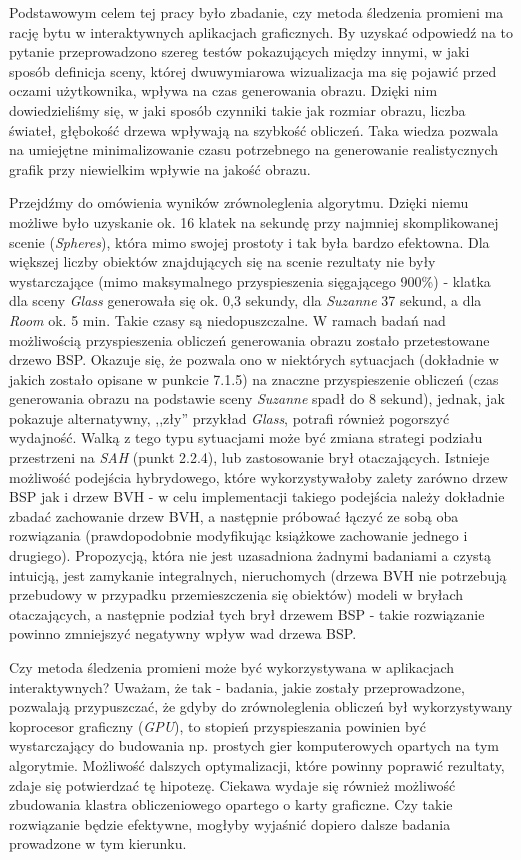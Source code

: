 Podstawowym celem tej pracy było zbadanie, czy metoda śledzenia promieni ma rację bytu w interaktywnych aplikacjach graficznych. By uzyskać odpowiedź na to pytanie przeprowadzono szereg testów pokazujących między innymi, w jaki sposób definicja sceny, której dwuwymiarowa wizualizacja ma się pojawić przed oczami użytkownika, wpływa na czas generowania obrazu. Dzięki nim dowiedzieliśmy się, w jaki sposób czynniki takie jak rozmiar obrazu, liczba świateł, głębokość drzewa wpływają na szybkość obliczeń. Taka wiedza pozwala na umiejętne minimalizowanie czasu potrzebnego na generowanie realistycznych grafik przy niewielkim wpływie na jakość obrazu.

Przejdźmy do omówienia wyników zrównoleglenia algorytmu. Dzięki niemu możliwe było uzyskanie ok. 16 klatek na sekundę przy najmniej skomplikowanej scenie (\emph{Spheres}), która mimo swojej prostoty i tak była bardzo efektowna. Dla większej liczby obiektów znajdujących się na scenie rezultaty nie były wystarczające (mimo maksymalnego przyspieszenia sięgającego 900\%) - klatka dla sceny \emph{Glass} generowała się ok. 0,3 sekundy, dla \emph{Suzanne} 37 sekund, a dla \emph{Room} ok. 5 min. Takie czasy są niedopuszczalne. W ramach badań nad możliwością przyspieszenia obliczeń generowania obrazu zostało przetestowane drzewo BSP. Okazuje się, że pozwala ono w niektórych sytuacjach (dokładnie w jakich zostało opisane w punkcie 7.1.5) na znaczne przyspieszenie obliczeń (czas generowania obrazu na podstawie sceny \emph{Suzanne} spadł do 8 sekund), jednak, jak pokazuje alternatywny, ,,zły'' przykład \emph{Glass}, potrafi również pogorszyć wydajność. Walką z tego typu sytuacjami może być zmiana strategi podziału przestrzeni na \emph{SAH} (punkt 2.2.4), lub zastosowanie brył otaczających. Istnieje możliwość podejścia hybrydowego, które wykorzystywałoby zalety zarówno drzew BSP jak i drzew BVH - w celu implementacji takiego podejścia należy dokładnie zbadać zachowanie drzew BVH, a następnie próbować łączyć ze sobą oba rozwiązania (prawdopodobnie modyfikując książkowe zachowanie jednego i drugiego). Propozycją, która nie jest uzasadniona żadnymi badaniami a czystą intuicją, jest zamykanie integralnych, nieruchomych (drzewa BVH nie potrzebują przebudowy w przypadku przemieszczenia się obiektów) modeli w bryłach otaczających, a następnie podział tych brył drzewem BSP - takie rozwiązanie powinno zmniejszyć negatywny wpływ wad drzewa BSP.

Czy metoda śledzenia promieni może być wykorzystywana w aplikacjach interaktywnych? Uważam, że tak - badania, jakie zostały przeprowadzone, pozwalają przypuszczać, że gdyby do zrównoleglenia obliczeń był wykorzystywany koprocesor graficzny (\emph{GPU}), to stopień przyspieszania powinien być wystarczający do budowania np. prostych gier komputerowych opartych na tym algorytmie. Możliwość dalszych optymalizacji, które powinny poprawić rezultaty, zdaje się potwierdzać tę hipotezę. Ciekawa wydaje się również możliwość zbudowania klastra obliczeniowego opartego o karty graficzne. Czy takie rozwiązanie będzie efektywne, mogłyby wyjaśnić dopiero dalsze badania prowadzone w tym kierunku.